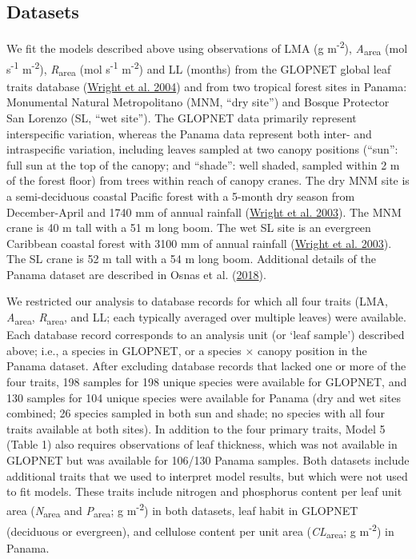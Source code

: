 \documentclass[
  12pt,
  a4paper,
,tablecaptionabove
]{scrartcl}
\begin{document}
\hypertarget{datasets}{%
\subsection{Datasets}\label{datasets}}

We fit the models described above using observations of LMA (g m\textsuperscript{-2}), \emph{A}\textsubscript{area} (mol s\textsuperscript{-1} m\textsuperscript{-2}), \emph{R}\textsubscript{area} (mol s\textsuperscript{-1} m\textsuperscript{-2}) and LL (months) from the GLOPNET global leaf traits database (\protect\hyperlink{ref-Wright2004a}{Wright et al. 2004}) and from two tropical forest sites in Panama: Monumental Natural Metropolitano (MNM, ``dry site'') and Bosque Protector San Lorenzo (SL, ``wet site'').
The GLOPNET data primarily represent interspecific variation, whereas the Panama data represent both inter- and intraspecific variation, including leaves sampled at two canopy positions (``sun'': full sun at the top of the canopy; and ``shade'': well shaded, sampled within 2 m of the forest floor) from trees within reach of canopy cranes.
The dry MNM site is a semi-deciduous coastal Pacific forest with a 5-month dry season from December-April and 1740 mm of annual rainfall (\protect\hyperlink{ref-Wright2003}{Wright et al. 2003}).
The MNM crane is 40 m tall with a 51 m long boom. The wet SL site is an evergreen Caribbean coastal forest with 3100 mm of annual rainfall (\protect\hyperlink{ref-Wright2003}{Wright et al. 2003}).
The SL crane is 52 m tall with a 54 m long boom.
Additional details of the Panama dataset are described in Osnas et al. (\protect\hyperlink{ref-Osnas2018}{2018}).

We restricted our analysis to database records for which all four traits (LMA, \emph{A}\textsubscript{area}, \emph{R}\textsubscript{area}, and LL; each typically averaged over multiple leaves) were available.
Each database record corresponds to an analysis unit (or `leaf sample') described above; i.e., a species in GLOPNET, or a species \(\times\) canopy position in the Panama dataset.
After excluding database records that lacked one or more of the four traits, 198 samples for 198 unique species were available for GLOPNET, and 130 samples for 104 unique species were available for Panama (dry and wet sites combined; 26 species sampled in both sun and shade; no species with all four traits available at both sites).
In addition to the four primary traits, Model 5 (Table 1) also requires observations of leaf thickness, which was not available in GLOPNET but was available for 106/130 Panama samples.
Both datasets include additional traits that we used to interpret model results, but which were not used to fit models. These traits include nitrogen and phosphorus content per leaf unit area (\emph{N}\textsubscript{area} and \emph{P}\textsubscript{area}; g m\textsuperscript{-2}) in both datasets, leaf habit in GLOPNET (deciduous or evergreen), and cellulose content per unit area (\emph{CL}\textsubscript{area}; g m\textsuperscript{-2}) in Panama.
\end{document}
